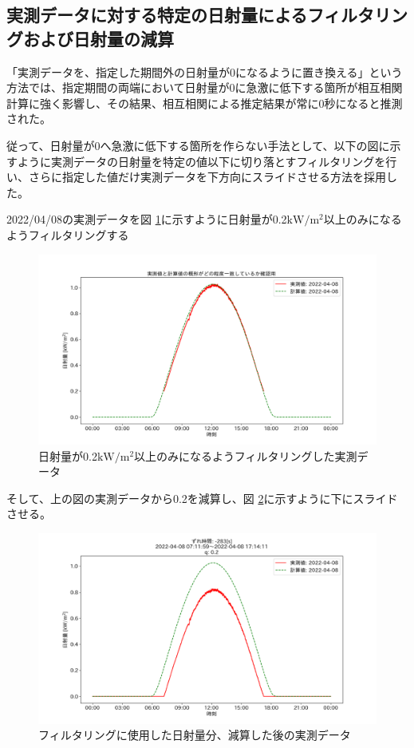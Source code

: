 \documentclass[a4j,12pt,]{jarticle}
\begin{document}
\subsection{実測データに対する特定の日射量によるフィルタリングおよび日射量の減算}
「実測データを、指定した期間外の日射量が0になるように置き換える」という方法では、指定期間の両端において日射量が0に急激に低下する箇所が相互相関計算に強く影響し、その結果、相互相関による推定結果が常に0秒になると推測された。

従って、日射量が0へ急激に低下する箇所を作らない手法として、以下の図に示すように実測データの日射量を特定の値以下に切り落とすフィルタリングを行い、さらに指定した値だけ実測データを下方向にスライドさせる方法を採用した。

2022/04/08の実測データを図 \ref{p9}に示すように日射量が0.2$\mathrm{kW}/\mathrm{m}^2$以上のみになるようフィルタリングする

\begin{figure}[H]
  \begin{center}
    \includegraphics[width=160mm]{2022-04-08_mask_by_q_plot.png}
    \caption{日射量が0.2$\mathrm{kW}/\mathrm{m}^2$以上のみになるようフィルタリングした実測データ}
    \label{p9}
  \end{center}
\end{figure}

そして、上の図の実測データから0.2を減算し、図 \ref{p10}に示すように下にスライドさせる。

\begin{figure}[H]
  \begin{center}
    \includegraphics[width=160mm]{2022-04-08_mask_by_q_corr.png}
    \caption{フィルタリングに使用した日射量分、減算した後の実測データ}
    \label{p10}
  \end{center}
\end{figure}
\end{document}
